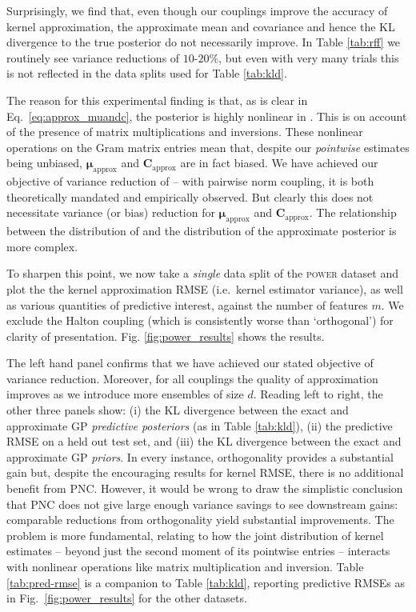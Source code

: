 Surprisingly, we find that, even though our couplings improve the accuracy of kernel approximation, the approximate mean and covariance and hence the KL divergence to the true posterior do not necessarily improve. 
In Table \ref{tab:rff} we routinely see variance reductions of $10$-$20$\%, but even with very many trials this is not reflected in the data splits used for Table \ref{tab:kld}.

The reason for this experimental finding is that, as is clear in Eq.~\ref{eq:approx_muandc}, the posterior is highly nonlinear in .
This is on account of the presence of matrix multiplications and inversions.
These nonlinear operations on the Gram matrix entries mean that, despite our \emph{pointwise} estimates being unbiased, $ \boldsymbol{\mu}_{\text{approx}}$ and $\mathbf{C}_{\text{approx}}$ are in fact biased. 
We have achieved our objective of variance reduction of  -- with pairwise norm coupling, it is both theoretically mandated and empirically observed.
But clearly this does not necessitate variance (or bias) reduction for $ \boldsymbol{\mu}_{\text{approx}}$ and $\mathbf{C}_{\text{approx}}$.
The relationship between the distribution of  and the distribution of the approximate posterior is more complex. 

To sharpen this point, we now take a \emph{single} data split of the {\scshape{power}} dataset and plot the the kernel approximation RMSE (i.e.~kernel estimator variance), as well as various quantities of predictive interest, against the number of features $m$.
We exclude the Halton coupling (which is consistently worse than `orthogonal') for clarity of presentation.
Fig. \ref{fig:power_results} shows the results.

The left hand panel confirms that we have achieved our stated objective of variance reduction. 
Moreover, for all couplings the quality of approximation improves as we introduce more ensembles of size $d$.
Reading left to right, the other three panels show: (i) the KL divergence between the exact and approximate GP \emph{predictive posteriors} (as in Table \ref{tab:kld}), (ii) the predictive RMSE on a held out test set, and (iii) the KL divergence between the exact and approximate GP \emph{priors}.
In every instance, orthogonality provides a substantial gain but, despite the encouraging results for kernel RMSE, there is no additional benefit from PNC. 
However, it would be wrong to draw the simplistic conclusion that PNC does not give large enough variance savings to see downstream gains: comparable reductions from orthogonality yield substantial improvements. 
The problem is more fundamental, relating to how the joint distribution of kernel estimates -- beyond just the second moment of its pointwise entries -- interacts with nonlinear operations like matrix multiplication and inversion.
Table \ref{tab:pred-rmse} is a companion to Table \ref{tab:kld}, reporting predictive RMSEs as in Fig.~\ref{fig:power_results} for the other datasets.

